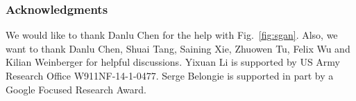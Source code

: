 \documentclass[10pt,twocolumn,letterpaper]{article}
\begin{document}
\subsubsection*{Acknowledgments}

We would like to thank Danlu Chen for the help with Fig.~\ref{fig:sgan}. Also, we want to thank Danlu Chen, Shuai Tang, Saining Xie, Zhuowen Tu, Felix Wu and Kilian  Weinberger for helpful discussions.  Yixuan Li is supported by US Army Research Office W911NF-14-1-0477. Serge Belongie is supported in part by a Google Focused Research Award.

{\small


}
\end{document}
